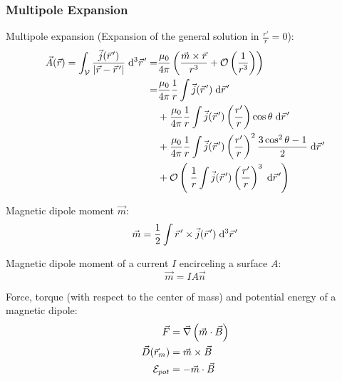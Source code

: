 		\subsubsection{Multipole Expansion}
			\noindent
			Multipole expansion (Expansion of the general solution in $\frac{r'}{r}=0$):
			\begin{equation}
				\begin{aligned}
					\vec{A}(\vec{r}) = \int_{\mathcal{V}} \frac{\vec{j}(\pvec{r}')}{\left|\vec{r}-\pvec{r}'\right|} \;\diff^3\pvec{r}'
					=& \frac{\mu_0}{4\pi} \left(\frac{\vec{m}\times\vec{r}}{r^3} + \mathcal{O}\left(\frac{1}{r^3}\right)\right) \\
					=& \frac{\mu_0}{4\pi}\frac{1}{r}\int\vec{j}(\pvec{r}')\;\diff \pvec{r}' \\
					&+ \frac{\mu_0}{4\pi}\frac{1}{r}\int\vec{j}(\pvec{r}')\left(\frac{r'}{r}\right)\cos\theta\;\diff \pvec{r}' \\
					&+ \frac{\mu_0}{4\pi}\frac{1}{r}\int\vec{j}(\pvec{r}')\left(\frac{r'}{r}\right)^2\frac{3\cos^2\theta-1}{2}\;\diff \pvec{r}' \\
					&+ \mathcal{O}\left(\;\frac{1}{r}\int\vec{j}(\pvec{r}')\left(\frac{r'}{r}\right)^3 \;\diff \pvec{r}'\right) \\
				\end{aligned}
			\end{equation}

			\noindent
			Magnetic dipole moment $\vec{m}$:
			\begin{equation}
				\begin{aligned}
					\vec{m} = \frac{1}{2}\int \pvec{r}'\times\vec{j}(\pvec{r}')\;\diff^3\pvec{r}'
				\end{aligned}
			\end{equation}

			\noindent
			Magnetic dipole moment of a current $I$ encirceling a surface $A$:
			\begin{equation}
				\vec{m} = IA\vec{n}
			\end{equation}

			\noindent
			Force, torque (with respect to the center of mass) and potential energy of a magnetic dipole:
			\begin{equation}
				\begin{aligned}
					\vec{F} &= \vec{\nabla}\left(\vec{m}\cdot\vec{B}\right) \\
					\vec{D}(\vec{r}_m) &= \vec{m}\times\vec{B} \\
					\mathcal{E}_{pot} &= -\vec{m}\cdot\vec{B} \\
				\end{aligned}
				\label{Eq:MagneticDipoleInteraction}
			\end{equation}

